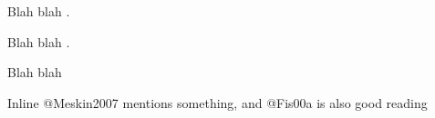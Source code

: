Blah blah \citetext{\citealp[see][]{Fis00a}, \citealp[also][]{Meskin2007}}.

Blah blah \citetext{\citealp[][]{Fis00a} and *passim*}.

Blah blah \citetext{\citealp[][]{Meskin2007}, \citealp[][]{Fis00a}}

Inline @Meskin2007 mentions something, and @Fis00a is also good reading

